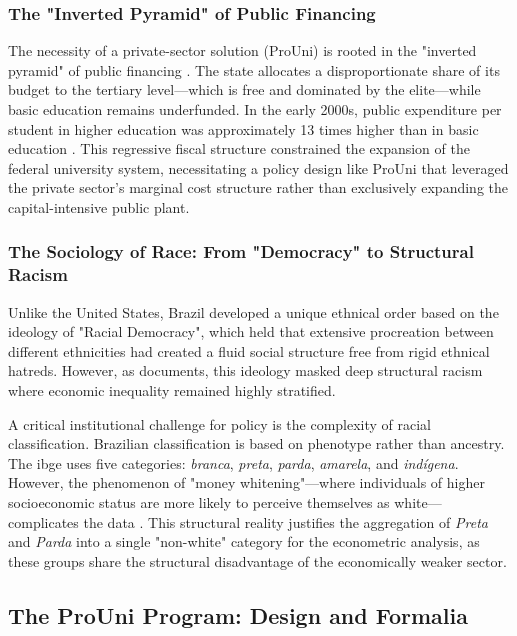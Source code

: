 \subsubsection{The "Inverted Pyramid" of Public Financing}
The necessity of a private-sector solution (ProUni) is rooted in the "inverted pyramid" of public financing \cite{WorldBank2002}. The state allocates a disproportionate share of its budget to the tertiary level—which is free and dominated by the elite—while basic education remains underfunded. In the early 2000s, public expenditure per student in higher education was approximately 13 times higher than in basic education \cite{McCowan2007}. This regressive fiscal structure constrained the expansion of the federal university system, necessitating a policy design like ProUni that leveraged the private sector's marginal cost structure rather than exclusively expanding the capital-intensive public plant.

\subsubsection{The Sociology of Race: From "Democracy" to Structural Racism}
Unlike the United States, Brazil developed a unique ethnical order based on the ideology of "Racial Democracy", which held that extensive procreation between different ethnicities had created a fluid social structure free from rigid ethnical hatreds. However, as  documents, this ideology masked deep structural racism where economic inequality remained highly stratified.

A critical institutional challenge for policy is the complexity of racial classification. Brazilian classification is based on phenotype rather than ancestry. The \acrshort{ibge} uses five categories: \textit{branca}, \textit{preta}, \textit{parda}, \textit{amarela}, and \textit{indígena}. However, the phenomenon of "money whitening"—where individuals of higher socioeconomic status are more likely to perceive themselves as white—complicates the data \cite{Telles2004}. This structural reality justifies the aggregation of \textit{Preta} and \textit{Parda} into a single "non-white" category for the econometric analysis, as these groups share the structural disadvantage of the economically weaker sector.

\subsection{The ProUni Program: Design and Formalia}
\label{sec:prouni_design}

